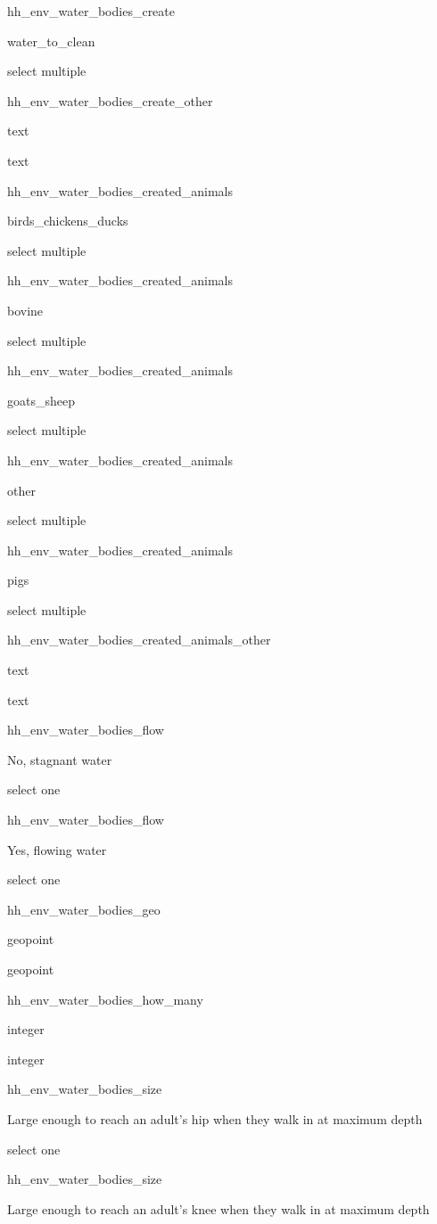 \documentclass[]{article}
\begin{document}
hh\_env\_water\_bodies\_create

water\_to\_clean

select multiple

hh\_env\_water\_bodies\_create\_other

text

text

hh\_env\_water\_bodies\_created\_animals

birds\_chickens\_ducks

select multiple

hh\_env\_water\_bodies\_created\_animals

bovine

select multiple

hh\_env\_water\_bodies\_created\_animals

goats\_sheep

select multiple

hh\_env\_water\_bodies\_created\_animals

other

select multiple

hh\_env\_water\_bodies\_created\_animals

pigs

select multiple

hh\_env\_water\_bodies\_created\_animals\_other

text

text

hh\_env\_water\_bodies\_flow

No, stagnant water

select one

hh\_env\_water\_bodies\_flow

Yes, flowing water

select one

hh\_env\_water\_bodies\_geo

geopoint

geopoint

hh\_env\_water\_bodies\_how\_many

integer

integer

hh\_env\_water\_bodies\_size

Large enough to reach an adult's hip when they walk in at maximum depth

select one

hh\_env\_water\_bodies\_size

Large enough to reach an adult's knee when they walk in at maximum depth
\end{document}
